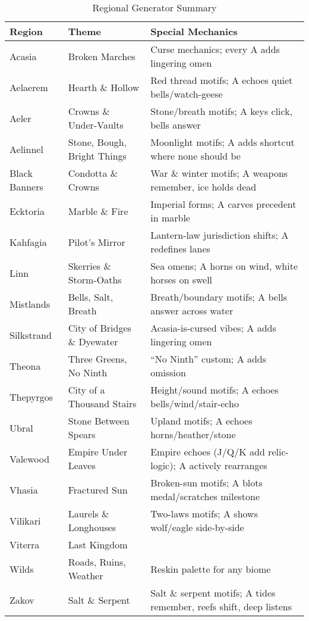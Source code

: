 \begin{table}[htbp]
\centering
\begin{tabular}{lll}
\toprule
\textbf{Region} & \textbf{Theme} & \textbf{Special Mechanics} \\
\midrule
Acasia & Broken Marches & Curse mechanics; every A adds lingering omen \\
Aelaerem & Hearth \& Hollow & Red thread motifs; A echoes quiet bells/watch-geese \\
Aeler & Crowns \& Under-Vaults & Stone/breath motifs; A keys click, bells answer \\
Aelinnel & Stone, Bough, Bright Things & Moonlight motifs; A adds shortcut where none should be \\
Black Banners & Condotta \& Crowns & War \& winter motifs; A weapons remember, ice holds dead \\
Ecktoria & Marble \& Fire & Imperial forms; A carves precedent in marble \\
Kahfagia & Pilot's Mirror & Lantern-law jurisdiction shifts; A redefines lanes \\
Linn & Skerries \& Storm-Oaths & Sea omens; A horns on wind, white horses on swell \\
Mistlands & Bells, Salt, Breath & Breath/boundary motifs; A bells answer across water \\
Silkstrand & City of Bridges \& Dyewater & Acasia-is-cursed vibes; A adds lingering omen \\
Theona & Three Greens, No Ninth & ``No Ninth'' custom; A adds omission \\
Thepyrgos & City of a Thousand Stairs & Height/sound motifs; A echoes bells/wind/stair-echo \\
Ubral & Stone Between Spears & Upland motifs; A echoes horns/heather/stone \\
Valewood & Empire Under Leaves & Empire echoes (J/Q/K add relic-logic); A actively rearranges \\
Vhasia & Fractured Sun & Broken-sun motifs; A blots medal/scratches milestone \\
Vilikari & Laurels \& Longhouses & Two-laws motifs; A shows wolf/eagle side-by-side \\
Viterra & Last Kingdom & & \\
Wilds & Roads, Ruins, Weather & Reskin palette for any biome \\
Zakov & Salt \& Serpent & Salt \& serpent motifs; A tides remember, reefs shift, deep listens \\
\bottomrule
\end{tabular}
\caption{Regional Generator Summary}
\end{table}


